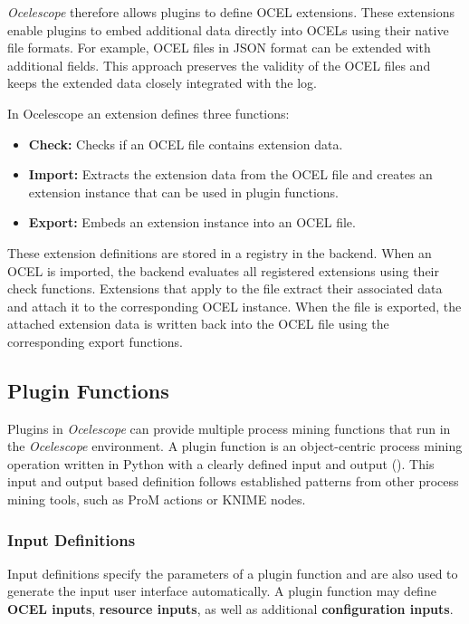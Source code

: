 \textit{Ocelescope} therefore allows plugins to define OCEL extensions. These extensions enable plugins to embed additional data directly into OCELs using their native file formats. For example, OCEL files in JSON format can be extended with additional fields. This approach preserves the validity of the OCEL files and keeps the extended data closely integrated with the log.

In Ocelescope an extension defines three functions:
\begin{itemize}
	\item \textbf{Check:} Checks if an OCEL file contains extension data.
	\item \textbf{Import:} Extracts the extension data from the OCEL file and creates an extension instance that can be used in plugin functions.
	\item \textbf{Export:} Embeds an extension instance into an OCEL file.
\end{itemize}

These extension definitions are stored in a registry in the backend. When an OCEL is imported, the backend evaluates all registered extensions using their check functions. Extensions that apply to the file extract their associated data and attach it to the corresponding OCEL instance. When the file is exported, the attached extension data is written back into the OCEL file using the corresponding export functions.

\subsection{Plugin Functions}

Plugins in \textit{Ocelescope} can provide multiple process mining functions that run in the \textit{Ocelescope} environment.
A plugin function is an object-centric process mining operation written in Python with a clearly defined input and output ().
This input and output based definition follows established patterns from other process mining tools, such as ProM actions or KNIME nodes.

\subsubsection{Input Definitions}

Input definitions specify the parameters of a plugin function and are also used to generate the input user interface automatically.
A plugin function may define \textbf{OCEL inputs}, \textbf{resource inputs}, as well as additional \textbf{configuration inputs}.

